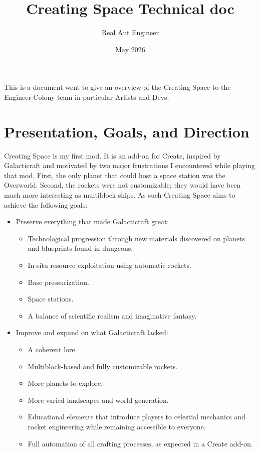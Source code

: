 \documentclass{article}
\title{Creating Space Technical doc}{\centering}
\author{Real Ant Engineer}
\date{May 2026}
\begin{document}
 
\maketitle

\newpage
This is a document went to give an overview of the Creating Space to the Engineer Colony team in particular Artists and Devs.
\newpage

\tableofcontents


\section{Presentation, Goals, and Direction}


Creating Space is my first mod. It is an add-on for Create, inspired by Galacticraft and motivated by two major frustrations I encountered while playing that mod. First, the only planet that could host a space station was the Overworld. Second, the rockets were not customizable; they would have been much more interesting as multiblock ships. As such Creating Space aims to achieve the following goals:

\begin{itemize}
    \item Preserve everything that made Galacticraft great:
    \begin{itemize}
        \item Technological progression through new materials discovered on planets and blueprints found in dungeons.
        \item In-situ resource exploitation using automatic rockets.
        \item Base pressurization.
        \item Space stations.
        \item A balance of scientific realism and imaginative fantasy.
    \end{itemize}

    \item Improve and expand on what Galacticraft lacked:
    \begin{itemize}
        \item A coherent lore.
        \item Multiblock-based and fully customizable rockets.
        \item More planets to explore.
        \item More varied landscapes and world generation.
        \item Educational elements that introduce players to celestial mechanics and rocket engineering while remaining accessible to everyone.
        \item Full automation of all crafting processes, as expected in a Create add-on.
    \end{itemize}
\end{itemize}
\end{document}
